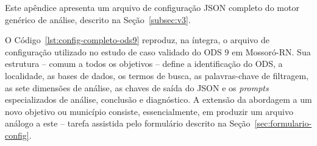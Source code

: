 \label{ap:config-json}

Este apêndice apresenta um arquivo de configuração JSON completo do motor genérico de análise, descrito na Seção~\ref{subsec:v3}.

O Código~\ref{lst:config-completo-ods9} reproduz, na íntegra, o arquivo de configuração utilizado no estudo de caso validado do ODS 9 em Mossoró-RN. Sua estrutura -- comum a todos os objetivos -- define a identificação do ODS, a localidade, as bases de dados, os termos de busca, as palavras-chave de filtragem, as sete dimensões de análise, as chaves de saída do JSON e os \textit{prompts} especializados de análise, conclusão e diagnóstico. A extensão da abordagem a um novo objetivo ou município consiste, essencialmente, em produzir um arquivo análogo a este -- tarefa assistida pelo formulário descrito na Seção~\ref{sec:formulario-config}.

